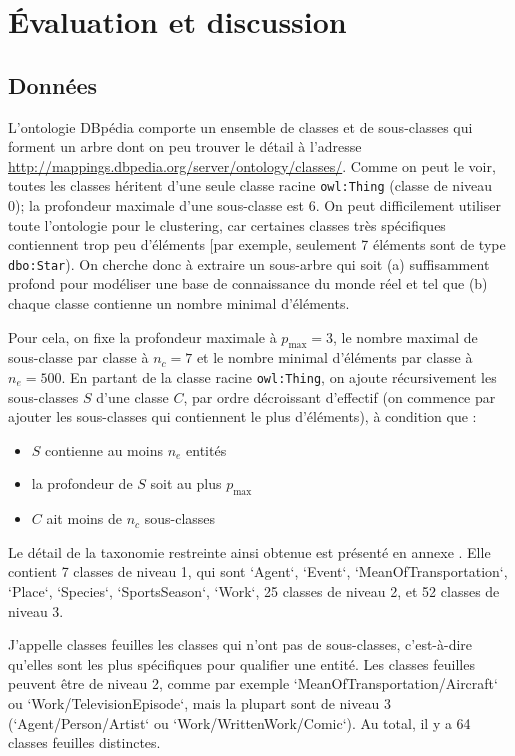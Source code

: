\section{Évaluation et discussion}
\label{sec:te-evaluation}

\subsection{Données}
\label{sec:te-data}

L'ontologie DBpédia comporte un ensemble de classes et de sous-classes qui forment un arbre dont on peu trouver le détail à l'adresse \href{http://mappings.dbpedia.org/server/ontology/classes/}{http://mappings.dbpedia.org/server/ontology/classes/}. Comme on peut le voir, toutes les classes héritent d'une seule classe racine \texttt{owl:Thing} (classe de niveau 0); la profondeur maximale d'une sous-classe est 6. On peut difficilement utiliser toute l'ontologie pour le clustering, car certaines classes très spécifiques contiennent trop peu d'éléments [par exemple, seulement 7 éléments sont de type \texttt{dbo:Star}). On cherche donc à extraire un sous-arbre qui soit (a) suffisamment profond pour modéliser une base de connaissance du monde réel et tel que (b) chaque classe contienne un nombre minimal d'éléments. 

Pour cela, on fixe la profondeur maximale à $p_{\max}=3$, le nombre maximal de sous-classe par classe à $n_c=7$ et le nombre minimal d'éléments par classe à $n_e=500$. En partant de la classe racine \texttt{owl:Thing}, on ajoute récursivement les sous-classes $S$ d'une classe $C$, par ordre décroissant d'effectif (on commence par ajouter les sous-classes qui contiennent le plus d'éléments), à condition que : 
\begin{itemize}
    \item $S$ contienne au moins $n_e$ entités
    \item la profondeur de $S$ soit au plus $p_{\max}$
    \item $C$ ait moins de $n_c$ sous-classes
\end{itemize}

Le détail de la taxonomie restreinte ainsi obtenue est présenté en annexe . Elle contient 7 classes de niveau 1, qui sont `Agent`, `Event`, `MeanOfTransportation`, `Place`, `Species`, `SportsSeason`, `Work`, 25 classes de niveau 2, et 52 classes de niveau 3. 

J'appelle classes feuilles les classes qui n'ont pas de sous-classes, c'est-à-dire qu'elles sont les plus spécifiques pour qualifier une entité. Les classes feuilles peuvent être de niveau 2, comme par exemple `MeanOfTransportation/Aircraft` ou  `Work/TelevisionEpisode`, mais la plupart sont de niveau 3 (`Agent/Person/Artist` ou `Work/WrittenWork/Comic`). Au total, il y a 64 classes feuilles distinctes.

